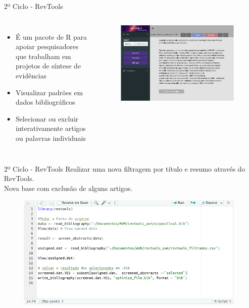 \begin{frame}{2º Ciclo - RevTools}
  \begin{columns}
    \begin{itemize}
      \item É um pacote de R para apoiar pesquisadores que trabalham em projetos de síntese de evidências
      \item Visualizar padrões em dados bibliográficos
      \item Selecionar ou excluir interativamente artigos ou palavras individuais 
    \end{itemize}
    
    \begin{figure}[hb]
      \includegraphics[width=1\textwidth]{figures/revtools.png}
		\end{figure}
	\end{columns}

\end{frame}

\begin{frame}{2º Ciclo - RevTools}
  Realizar uma nova filtragem por título e resumo através do RevTools. \\
  Nova base com exclusão de alguns artigos.
  \begin{figure}[hb]
    \includegraphics[width=1\textwidth]{figures/revtoolscod.png}
  \end{figure}

\end{frame}
